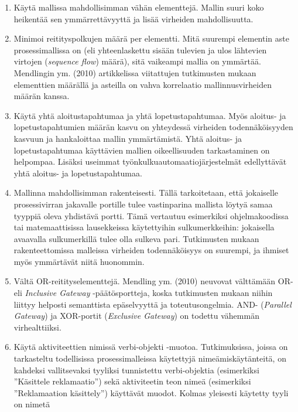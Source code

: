 \documentclass[
  finnish,
  letterpaper,
  DIV=11,
  numbers=noendperiod,
  oneside]{scrreprt}
\providecommand{\tightlist}{%
  \setlength{\itemsep}{0pt}\setlength{\parskip}{0pt}}
\begin{document}
\begin{enumerate}
\def\labelenumi{\arabic{enumi}.}
\tightlist
\item
  Käytä mallissa mahdollisimman vähän elementtejä. Mallin suuri koko
  heikentää sen ymmärrettävyyttä ja lisää virheiden mahdollisuutta.
\item
  Minimoi reitityspolkujen määrä per elementti. Mitä suurempi elementin
  aste prosessimallissa on (eli yhteenlaskettu sisään tulevien ja ulos
  lähtevien virtojen (\emph{sequence flow}) määrä), sitä vaikeampi
  mallia on ymmärtää. Mendlingin ym. (2010) artikkelissa viitattujen
  tutkimusten mukaan elementtien määrällä ja asteilla on vahva
  korrelaatio mallinnusvirheiden määrän kanssa.
\item
  Käytä yhtä aloitustapahtumaa ja yhtä lopetustapahtumaa. Myös aloitus-
  ja lopetustapahtumien määrän kasvu on yhteydessä virheiden
  todennäköisyyden kasvuun ja hankaloittaa mallin ymmärtämistä. Yhtä
  aloitus- ja lopetustapahtumaa käyttävien mallien oikeellisuuden
  tarkastaminen on helpompaa. Lisäksi useimmat
  työnkulkuautomaatiojärjestelmät edellyttävät yhtä aloitus- ja
  lopetustapahtumaa.
\item
  Mallinna mahdollisimman rakenteisesti. Tällä tarkoitetaan, että
  jokaiselle prosessivirran jakavalle portille tulee vastinparina
  mallista löytyä samaa tyyppiä oleva yhdistävä portti. Tämä vertautuu
  esimerkiksi ohjelmakoodissa tai matemaattisissa lausekkeissa
  käytettyihin sulkumerkkeihin: jokaisella avaavalla sulkumerkillä tulee
  olla sulkeva pari. Tutkimusten mukaan rakenteettomissa malleissa
  virheiden todennäköisyys on suurempi, ja ihmiset myös ymmärtävät niitä
  huonommin.
\item
  Vältä OR-reitityselementtejä. Mendling ym. (2010) neuvovat välttämään
  OR- eli \emph{Inclusive Gateway} -päätösportteja, koska tutkimusten
  mukaan niihin liittyy helposti semanttista epäselvyyttä ja
  toteutusongelmia. AND- (\emph{Parallel Gateway}) ja XOR-portit
  (\emph{Exclusive Gateway}) on todettu vähemmän virhealttiiksi.
\item
  Käytä aktiviteettien nimissä verbi-objekti -muotoa. Tutkimuksissa,
  joissa on tarkasteltu todellisissa prosessimalleissa käytettyjä
  nimeämiskäytänteitä, on kahdeksi vallitsevaksi tyyliksi tunnistettu
  verbi-objektia (esimerkiksi ''Käsittele reklamaatio'') sekä
  aktiviteetin teon nimeä (esimerkiksi ''Reklamaation käsittely'')
  käyttävät muodot. Kolmas yleisesti käytetty tyyli on nimetä

\end{enumerate}
\end{document}
